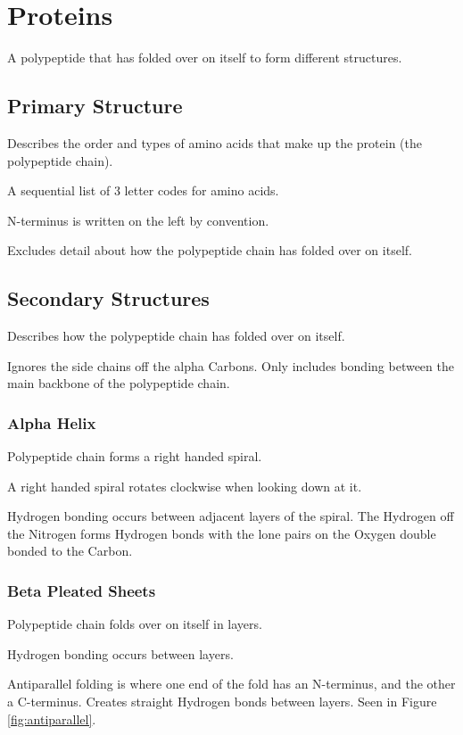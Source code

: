 \documentclass[a4paper,11pt]{article}
\begin{document}
\section{Proteins}

A polypeptide that has folded over on itself to form different structures.


\subsection{Primary Structure}

Describes the order and types of amino acids that make up the protein (the
polypeptide chain).

A sequential list of 3 letter codes for amino acids.

N-terminus is written on the left by convention.

Excludes detail about how the polypeptide chain has folded over on itself.


\subsection{Secondary Structures}

Describes how the polypeptide chain has folded over on itself.

Ignores the side chains off the alpha Carbons. Only includes bonding between
the main backbone of the polypeptide chain.


\subsubsection{Alpha Helix}

Polypeptide chain forms a right handed spiral.

A right handed spiral rotates clockwise when looking down at it.

Hydrogen bonding occurs between adjacent layers of the spiral. The Hydrogen
off the Nitrogen forms Hydrogen bonds with the lone pairs on the Oxygen double
bonded to the Carbon.


\subsubsection{Beta Pleated Sheets}

Polypeptide chain folds over on itself in layers.

Hydrogen bonding occurs between layers.

Antiparallel folding is where one end of the fold has an N-terminus, and the
other a C-terminus. Creates straight Hydrogen bonds between layers. Seen in
Figure \ref{fig:antiparallel}.
\end{document}
